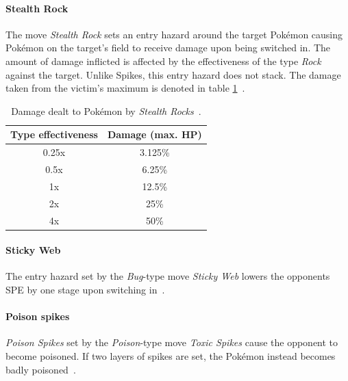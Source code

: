 \paragraph{Stealth Rock}
\label{sec:stealthrock}
The move \textit{Stealth Rock} sets an entry hazard around the target Pokémon
causing Pokémon on the target's field to receive damage upon being switched in.
The amount of damage inflicted is affected by the effectiveness of the type
\textit{Rock} against the target. Unlike Spikes, this entry hazard does not stack.
The damage taken from the victim's maximum is denoted in table 
\ref{tab:stealth-rock-damage}~\autocite{Bulbapedia:StealthRock}.
\begin{table}[h]
	\centering
	\caption{Damage dealt to Pokémon by \textit{Stealth Rocks}~\autocite{Bulbapedia:StealthRock}.}
	\label{tab:stealth-rock-damage}
	\begin{tabular}{|c|c|}
		\hline
		\textbf{Type effectiveness} & \textbf{Damage (max. \ac{HP}}) \\
		\hline 
		0.25x & 3.125\% \\ 
		\hline 
		0.5x &  6.25\% \\ 
		\hline 
		1x & 12.5\% \\
		\hline
		2x & 25\% \\
		\hline
		4x & 50\% \\
		\hline
	\end{tabular} 
\end{table}

\paragraph{Sticky Web}
The entry hazard set by the \textit{Bug}-type move \textit{Sticky Web} lowers the
opponents \ac{SPE} by one stage upon switching in~\autocite{Bulbapedia:StickyWeb}. 

\paragraph{Poison spikes}
\label{sec:poison-spikes}
\textit{Poison Spikes} set by the \textit{Poison}-type move \textit{Toxic Spikes}
cause the opponent to become poisoned. If two layers of spikes are set, the
Pokémon instead becomes badly poisoned~\autocite{Bulbapedia:ToxicSpikes}.

